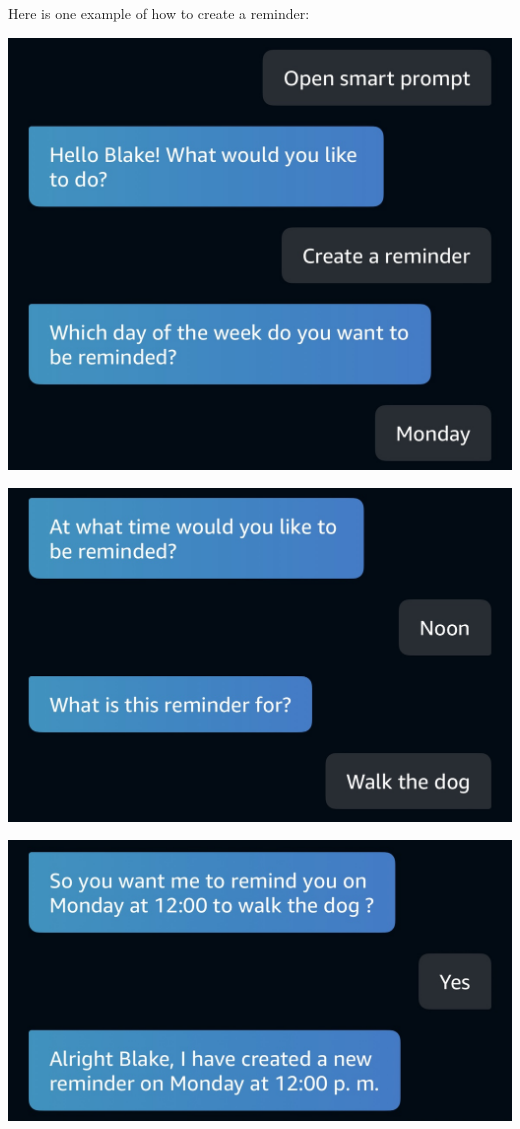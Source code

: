 \documentclass[11pt, oneside]{article}
\begin{document}
Here is one example of how to create a reminder:
\begin{center}
  \includegraphics[width=\linewidth * 3/4]{images/createReminder1a.jpg}
\end{center}
\begin{center}
  \includegraphics[width=\linewidth * 3/4]{images/createReminder1b.jpg}
\end{center}
\begin{center}
  \includegraphics[width=\linewidth * 3/4]{images/createReminder1c.jpg}
\end{center}
\end{document}
